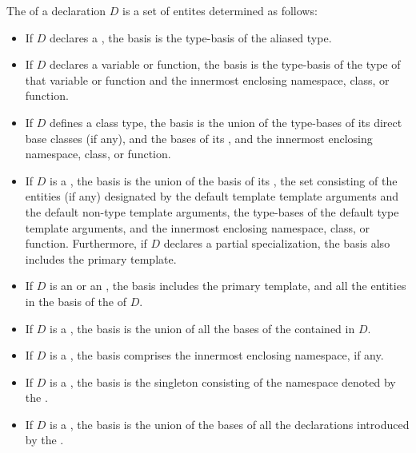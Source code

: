 \begin{std.txt}
\alinea
The  of a declaration $D$ is a set of entites determined as follows:
\begin{itemize}
\item If $D$ declares a , the basis is the
type-basis of the aliased type.

\item If $D$ declares a variable or function, the basis is the type-basis
of the type of that variable or function and the innermost enclosing
namespace, class, or function.

\item If $D$ defines a class type, the basis is the union of the
type-bases of its direct base classes (if any), and the bases of
its ,
and the innermost enclosing namespace, class, or function.

\item If $D$ is a ,
the basis is the union
of the basis of its , the set
consisting of the entities (if any) designated by the default
template template arguments and the default non-type template arguments,
the type-bases of the default type template arguments,
and the innermost enclosing namespace, class, or function.
Furthermore, if $D$ declares a partial specialization,
the basis also includes the primary template.

\item If $D$ is an 
or an , the basis includes
the primary template, and all the entities in the basis of the
 of $D$.

\item If $D$ is a , the basis is the union
of all the bases of the  contained in $D$.

\item If $D$ is a , the basis comprises
the innermost enclosing namespace, if any.

\item If $D$ is a , the basis is the 
singleton consisting of the namespace denoted by the
.

\item If $D$ is a , the basis is the union
of the bases of all the declarations introduced by
the .


\end{itemize}
\end{std.txt}

